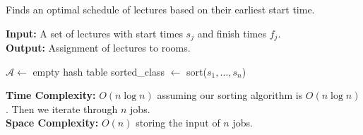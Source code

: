     \newpage
    \begin{Func}[EarliestStartTimeFirst Algorithm - \texttt{EST($j = 1 \dots n : s_j, f_j$)}]
        Finds an optimal schedule of lectures based on their earliest start time.
        
        \vspace{.5em}
        \noindent
        \textbf{Input:} A set of lectures with start times $s_j$ and finish times $f_j$.\\
        \textbf{Output:} Assignment of lectures to rooms.\\
        \begin{algorithm}[H]
            \SetAlgoLined
            $\mathcal{A} \gets$ empty hash table 
            sorted\_class $\gets$ sort($s_1, \dots, s_n$) 
            
        \end{algorithm}

        \noindent
        \textbf{Time Complexity:} $O(n\log n)$ assuming our sorting algorithm is $O(n\log n)$. Then we iterate through $n$ jobs.\\
        \textbf{Space Complexity:} $O(n)$ storing the input of $n$ jobs.
    \end{Func}

    
    
    
